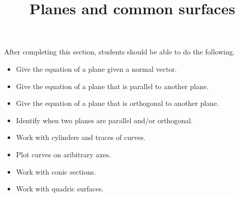 \documentclass{ximera}
\title{Planes and common surfaces}
\begin{document}
\begin{abstract}
\end{abstract}

\maketitle

\begin{sectionOutcomes}

After completing this section, students should be able to do the following.

\begin{itemize}
\item Give the equation of a plane given a normal vector.
\item Give the equation of a plane that is parallel to another plane.
\item Give the equation of a plane that is orthogonal to another plane.
\item Identify when two planes are parallel and/or orthogonal.
\item Work with cylinders and traces of curves.
\item Plot curves on aribitrary axes.
\item Work with conic sections. 
\item Work with quadric surfaces.
\end{itemize}

\end{sectionOutcomes}
\end{document}
